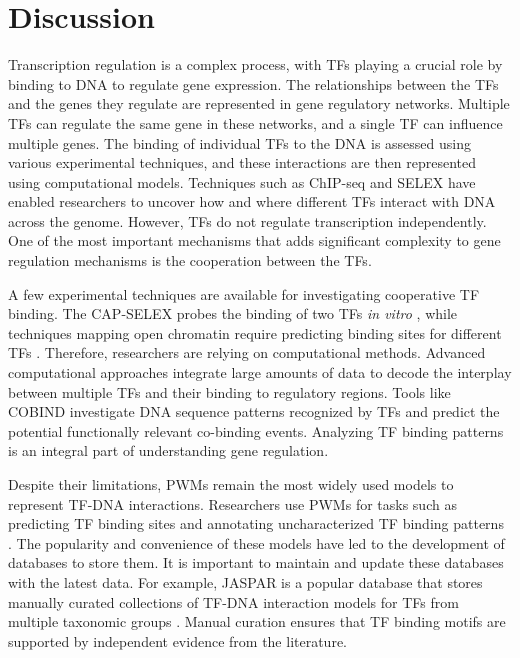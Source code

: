 \chapter{Discussion}

Transcription regulation is a complex process, with TFs playing a crucial role by binding to DNA to regulate gene expression. The relationships between the TFs and the genes they regulate are represented in gene regulatory networks. Multiple TFs can regulate the same gene in these networks, and a single TF can influence multiple genes. The binding of individual TFs to the DNA is assessed using various experimental techniques, and these interactions are then represented using computational models. Techniques such as ChIP-seq and SELEX have enabled researchers to uncover how and where different TFs interact with DNA across the genome. However, TFs do not regulate transcription independently. One of the most important mechanisms that adds significant complexity to gene regulation mechanisms is the cooperation between the TFs.

A few experimental techniques are available for investigating cooperative TF binding. The CAP-SELEX probes the binding of two TFs \textit{in vitro} \cite{jolma2015dna}, while techniques mapping open chromatin require predicting binding sites for different TFs \cite{schmidt2017combining}. Therefore, researchers are relying on computational methods. Advanced computational approaches integrate large amounts of data to decode the interplay between multiple TFs and their binding to regulatory regions. Tools like COBIND investigate DNA sequence patterns recognized by TFs and predict the potential functionally relevant co-binding events. Analyzing TF binding patterns is an integral part of understanding gene regulation.

Despite their limitations, PWMs remain the most widely used models to represent TF-DNA interactions. Researchers use PWMs for tasks such as predicting TF binding sites and annotating uncharacterized TF binding patterns \cite{boeva2016analysis}. The popularity and convenience of these models have led to the development of databases to store them. It is important to maintain and update these databases with the latest data. For example, JASPAR is a popular database that stores manually curated collections of TF-DNA interaction models for TFs from multiple taxonomic groups \cite{rauluseviciute2024jaspar}. Manual curation ensures that TF binding motifs are supported by independent evidence from the literature.

